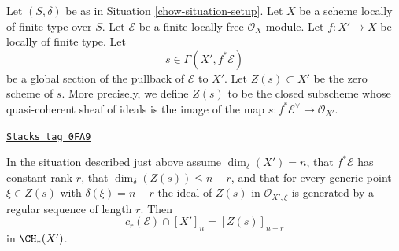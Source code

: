 \medskip\noindent
Let $(S, \delta)$ be as in Situation \ref{chow-situation-setup}. Let $X$ be a scheme
locally of finite type over $S$. Let $\mathcal{E}$ be a finite locally
free $\mathcal{O}_X$-module. Let $f : X' \to X$ be locally of finite type. Let
$$
s \in \Gamma(X', f^*\mathcal{E})
$$
be a global section of the pullback of $\mathcal{E}$ to $X'$. Let
$Z(s) \subset X'$ be the zero scheme of $s$. More precisely, we define
$Z(s)$ to be the closed subscheme whose quasi-coherent sheaf
of ideals is the image of the map
$s : f^*\mathcal{E}^\vee \to \mathcal{O}_{X'}$.

\begin{lemma}
\label{chow-lemma-top-chern-class}
\href{https://stacks.math.columbia.edu/tag/0FA9}{\texttt{Stacks tag 0FA9}}

In the situation described just above assume $\dim_\delta(X') = n$,
that $f^*\mathcal{E}$ has constant rank $r$, that
$\dim_\delta(Z(s)) \leq n - r$, and that for every generic point
$\xi \in Z(s)$ with $\delta(\xi) = n - r$ the ideal of $Z(s)$
in $\mathcal{O}_{X', \xi}$ is generated by a regular sequence
of length $r$. Then
$$
c_r(\mathcal{E}) \cap [X']_n = [Z(s)]_{n - r}
$$
in $\CH_*(X')$.
\end{lemma}


